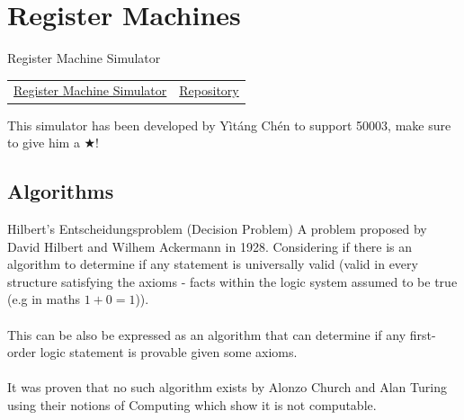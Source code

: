 \chapter{Register Machines}

\begin{sidenotebox}{Register Machine Simulator}
	\begin{center}
		\begin{tabular}{c c}
			\href{https://flutter-rm.herokuapp.com/#/}{Register Machine Simulator} &  \href{https://github.com/MMZK1526/Haskell-RM}{Repository} \\
		\end{tabular}
	\end{center}
	This simulator has been developed by Yìtáng Chén to support 50003, make sure to give him a $\bigstar$! 
\end{sidenotebox}
\section{Algorithms}

\begin{definitionbox}{Hilbert's Entscheidungsproblem (Decision Problem)}
	A problem proposed by David Hilbert and Wilhem Ackermann in 1928. Considering if there is an algorithm to determine if any statement is universally valid (valid in every structure satisfying the axioms - facts within the logic system assumed to be true (e.g in maths $1 + 0 = 1$)).
	\\
	\\ This can be also be expressed as an algorithm that can determine if any first-order logic statement is provable given some axioms.
	\\
	\\ It was proven that no such algorithm exists by Alonzo Church and Alan Turing using their notions of Computing which show it is not computable.
\end{definitionbox}

